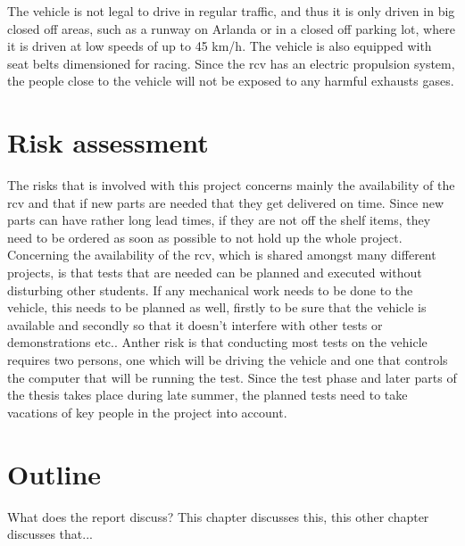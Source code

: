\documentclass[a4paper,11pt]{kth-mag}
\begin{document}
The vehicle is not legal to drive in regular traffic, and thus it is only driven in big closed off areas, such as a runway on Arlanda or in a closed off parking lot, where it is driven at low speeds of up to 45 km/h. The vehicle is also equipped with seat belts dimensioned for racing. 
Since the \gls{rcv} has an electric propulsion system, the people close to the vehicle will not be exposed to any harmful exhausts gases. 


\section{Risk assessment}
The risks that is involved with this project concerns mainly the availability of the \gls{rcv} and that if new parts are needed that they get delivered on time. Since new parts can have rather long lead times, if they are not off the shelf items, they need to be ordered as soon as possible to not hold up the whole project. Concerning the availability of the \gls{rcv}, which is shared amongst many different projects, is that tests that are needed can be planned and executed without disturbing other students. If any mechanical work needs to be done to the vehicle, this needs to be planned as well, firstly to be sure that the vehicle is available and secondly so that it doesn't interfere with other tests or demonstrations etc.. 
Anther risk is that conducting most tests on the vehicle requires two persons, one which will be driving the vehicle and one that controls the computer that will be running the test. Since the test phase and later parts of the thesis takes place during late summer, the planned tests need to take vacations of key people in the project into account. \newline

%
%
%
%

\section{Outline}
What does the report discuss?
This chapter discusses this, this other chapter discusses that...
\end{document}
